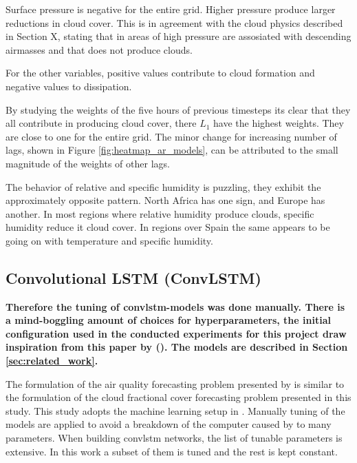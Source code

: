 Surface pressure is negative for the entire grid. Higher pressure produce larger reductions in cloud cover. This is in agreement with the cloud physics described in Section X, stating that in areas of high pressure are assosiated with descending airmasses and that does not produce clouds. 

For the other variables, positive values contribute to cloud formation and negative values to dissipation.

By studying the weights of the five hours of previous timesteps its clear that they all contribute in producing cloud cover, there $L_1$ have the highest weights. They are close to one for the entire grid. The minor change for increasing number of lags, shown in Figure \ref{fig:heatmap_ar_models}, can be attributed to the small magnitude of the weights of other lags. 

The behavior of relative and specific humidity is puzzling, they exhibit the approximately opposite pattern. North Africa has one sign, and Europe has another. In most regions where relative humidity produce clouds, specific humidity reduce it cloud cover. In regions over Spain the same appears to be going on with temperature and specific humidity. 

\clearpage

\subsection{Convolutional LSTM (ConvLSTM)}
\textbf{Therefore the tuning of \acrshort{convlstm}-models was done manually. There is a mind-boggling amount of choices for hyperparameters, the initial configuration used in the conducted experiments for this project draw inspiration from this paper by \citeauthor{SunAirLSTM} (\citeyear{SunAirLSTM}).
The models are described in Section \ref{sec:related_work}.}

The formulation of the air quality forecasting problem presented by \citeauthor{SunAirLSTM} is similar to the formulation of the cloud fractional cover forecasting problem presented in this study. 
This study adopts the machine learning setup in . Manually tuning of the models are applied to avoid a breakdown of the computer caused by to many parameters. When building \acrshort{convlstm} networks, the list of tunable parameters is extensive. In this work a subset of them is tuned and the rest is kept constant.

